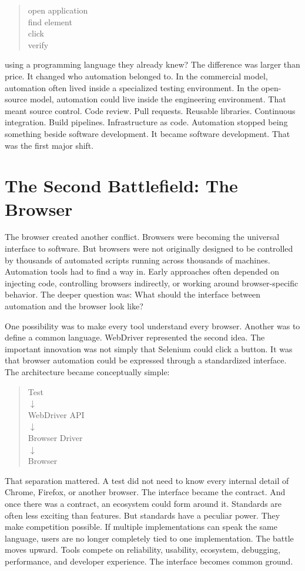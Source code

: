 \documentclass[11pt,twoside]{book}
\begin{document}
\begin{quote}
open application\\
find element\\
click\\
verify
\end{quote}

using a programming language they already knew?
The difference was larger than price.
It changed who automation belonged to.
In the commercial model, automation often lived inside a specialized testing environment.
In the open-source model, automation could live inside the engineering environment.
That meant source control.
Code review.
Pull requests.
Reusable libraries.
Continuous integration.
Build pipelines.
Infrastructure as code.
Automation stopped being something beside software development.
It became software development.
That was the first major shift.

\section*{The Second Battlefield: The Browser}

The browser created another conflict.
Browsers were becoming the universal interface to software.
But browsers were not originally designed to be controlled by thousands of automated scripts running across thousands of machines.
Automation tools had to find a way in.
Early approaches often depended on injecting code, controlling browsers indirectly, or working around browser-specific behavior.
The deeper question was:
What should the interface between automation and the browser look like?

One possibility was to make every tool understand every browser.
Another was to define a common language.
WebDriver represented the second idea.
The important innovation was not simply that Selenium could click a button.
It was that browser automation could be expressed through a standardized interface.
The architecture became conceptually simple:

\begin{quote}
\centering
Test\\
$\downarrow$\\
WebDriver API\\
$\downarrow$\\
Browser Driver\\
$\downarrow$\\
Browser
\end{quote}

That separation mattered.
A test did not need to know every internal detail of Chrome, Firefox, or another browser.
The interface became the contract.
And once there was a contract, an ecosystem could form around it.
Standards are often less exciting than features.
But standards have a peculiar power.
They make competition possible.
If multiple implementations can speak the same language, users are no longer completely tied to one implementation.
The battle moves upward.
Tools compete on reliability, usability, ecosystem, debugging, performance, and developer experience.
The interface becomes common ground.
\end{document}
